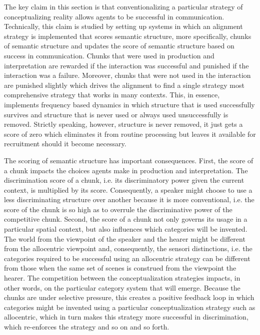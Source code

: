 The key claim in this section is that conventionalizing a particular strategy of 
conceptualizing reality allows agents to be successful in communication. 
Technically, this claim is studied by setting up systems in which an alignment strategy is 
implemented that scores semantic structure, more specifically, chunks of semantic structure
and updates the score of semantic structure based on success in communication. 
Chunks that were used in production and interpretation are rewarded
if the interaction was successful and punished if the interaction was a failure. 
Moreover, chunks that were not used in the interaction are punished slightly
which drives the alignment to find a single strategy most comprehensive strategy that
works in many contexts. This, in essence, implements frequency based dynamics in which structure
that is used successfully survives and structure that is never used or always used unsuccessfully
is removed. Strictly speaking, however, structure is never removed, it just gets a score of zero
which eliminates it from routine processing but leaves it available for recruitment should
it become necessary.

The scoring of semantic structure has important consequences. First, the score of a chunk impacts
the choices agents make in production and interpretation. The discrimination score of a chunk, i.e. its discriminatory power given the current context, is multiplied by its score. Consequently,
a speaker might choose to use a less discriminating structure over another because it is 
more conventional, i.e. the score of the chunk is so high as to overrule the discriminative power of the
competitive chunk. Second, the score of a chunk not only governs its usage in a particular spatial context, 
but also influences which categories will be invented. The world from the viewpoint of the
speaker and the hearer might be different from the allocentric viewpoint and, consequently,
the sensori distinctions, i.e. the categories required to be successful using an allocentric strategy 
can be different from those when the same set of scenes is construed from the viewpoint the hearer.
The competition between the conceptualization strategies impacts, in other words, on the particular
category system that will emerge. Because the chunks are under selective pressure, this creates 
a positive feedback loop in which categories might be invented using a particular conceptualization
strategy such as allocentric, which in turn makes this strategy more successful in 
discrimination, which re-enforces the strategy and so on and so forth. 

